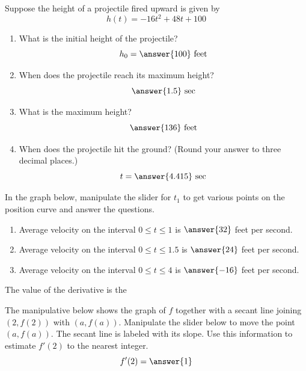 \documentclass{ximera}
\begin{document}
 \begin{problem}\label{prob:240hom3prob1}
 Suppose the height of a projectile fired upward is given by $$h(t)=-16t^2+48t+100$$
 \begin{enumerate}
     \item What is the initial height of the projectile?
     $$h_0=\answer{100}\mbox{ feet}$$
     \item When does the projectile reach its maximum height?
     $$\answer{1.5}\mbox{ sec}$$
     \item What is the maximum height?
     $$\answer{136}\mbox{ feet}$$
     \item When does the projectile hit the ground? (Round your answer to three decimal places.)
     $$t=\answer{4.415}\mbox{ sec}$$
 \end{enumerate}
 
In the graph below, manipulate the slider for $t_1$ to get various points on the position curve and answer the questions.

\begin{center}  
\end{center}

\begin{enumerate}
    \item Average velocity on the interval $0\leq t\leq 1$ is $\answer{32}$ feet per second.
    \item Average velocity on the interval $0\leq t\leq 1.5$ is $\answer{24}$ feet per second.
    \item Average velocity on the interval $0\leq t\leq 4$ is $\answer{-16}$ feet per second.
\end{enumerate}
\end{problem}

 \begin{problem}\label{prob:240hom3prob6}
 The value of the derivative is the 
 \end{problem}

 \begin{problem}\label{prob:240hom3prob2}
 The manipulative below shows the graph of $f$ together with a secant line joining $(2,f(2))$ with $(a,f(a))$.  Manipulate the slider below to move the point $(a,f(a))$.  The secant line is labeled with its slope.  Use this information to estimate $f'(2)$ to the nearest integer.
 $$f'(2)=\answer{1}$$
 \begin{center}  
\end{center}

 \end{problem}
 
\end{document}
